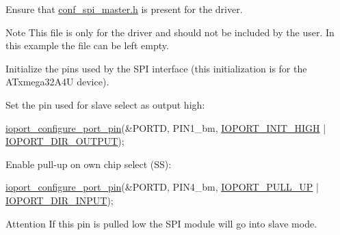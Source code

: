 \begin{DoxyEnumerate}
\item Ensure that \hyperlink{conf__spi__master_8h}{conf\-\_\-spi\-\_\-master.\-h} is present for the driver.
\begin{DoxyItemize}
\item \begin{DoxyNote}{Note}
This file is only for the driver and should not be included by the user. In this example the file can be left empty.
\end{DoxyNote}

\end{DoxyItemize}
\item Initialize the pins used by the S\-P\-I interface (this initialization is for the A\-Txmega32\-A4\-U device).
\begin{DoxyEnumerate}
\item Set the pin used for slave select as output high\-: 
\begin{DoxyCode}
        \hyperlink{ioport__compat_8h_a8da4959022f2cec05f59a9939671ff7e}{ioport\_configure\_port\_pin}(&PORTD, PIN1\_bm, 
      \hyperlink{ioport__compat_8h_a6fd5b83fc296e4d6d791f8b074731d8e}{IOPORT\_INIT\_HIGH} | \hyperlink{group__ioport__group_gga9c267f89800e58bd9dfd74e662a4a4c1a06de24313dad0169f3a366c62a84f4cc}{IOPORT\_DIR\_OUTPUT});
\end{DoxyCode}

\item Enable pull-\/up on own chip select (S\-S)\-: 
\begin{DoxyCode}
        \hyperlink{ioport__compat_8h_a8da4959022f2cec05f59a9939671ff7e}{ioport\_configure\_port\_pin}(&PORTD, PIN4\_bm, 
      \hyperlink{ioport__compat_8h_acbd350ec39fe567a7c0e423b000746fb}{IOPORT\_PULL\_UP} | \hyperlink{group__ioport__group_gga9c267f89800e58bd9dfd74e662a4a4c1af854a0dce084e5a8e8744f9a502e7b7b}{IOPORT\_DIR\_INPUT});
\end{DoxyCode}
 \begin{DoxyAttention}{Attention}
If this pin is pulled low the S\-P\-I module will go into slave mode.
\end{DoxyAttention}


\end{DoxyEnumerate}
\end{DoxyEnumerate}
